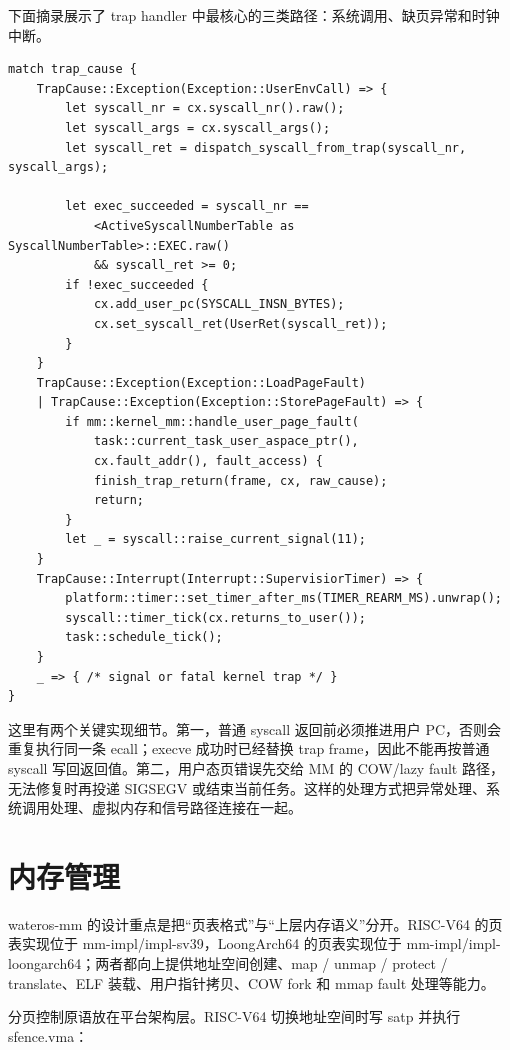 \documentclass[12pt,openany,oneside,AutoFakeBold=true]{ctexbook}
\newcommand{\code}[1]{\textnormal{\rmfamily #1}}
\newcommand{\syscall}[1]{\textnormal{\rmfamily #1}}
\begin{document}
下面摘录展示了 trap handler 中最核心的三类路径：系统调用、缺页异常和时钟中断。

\begin{lstlisting}
match trap_cause {
    TrapCause::Exception(Exception::UserEnvCall) => {
        let syscall_nr = cx.syscall_nr().raw();
        let syscall_args = cx.syscall_args();
        let syscall_ret = dispatch_syscall_from_trap(syscall_nr, syscall_args);

        let exec_succeeded = syscall_nr ==
            <ActiveSyscallNumberTable as SyscallNumberTable>::EXEC.raw()
            && syscall_ret >= 0;
        if !exec_succeeded {
            cx.add_user_pc(SYSCALL_INSN_BYTES);
            cx.set_syscall_ret(UserRet(syscall_ret));
        }
    }
    TrapCause::Exception(Exception::LoadPageFault)
    | TrapCause::Exception(Exception::StorePageFault) => {
        if mm::kernel_mm::handle_user_page_fault(
            task::current_task_user_aspace_ptr(),
            cx.fault_addr(), fault_access) {
            finish_trap_return(frame, cx, raw_cause);
            return;
        }
        let _ = syscall::raise_current_signal(11);
    }
    TrapCause::Interrupt(Interrupt::SupervisiorTimer) => {
        platform::timer::set_timer_after_ms(TIMER_REARM_MS).unwrap();
        syscall::timer_tick(cx.returns_to_user());
        task::schedule_tick();
    }
    _ => { /* signal or fatal kernel trap */ }
}
\end{lstlisting}

这里有两个关键实现细节。第一，普通 syscall 返回前必须推进用户 PC，否则会重复执行同一条 \code{ecall}；\syscall{execve} 成功时已经替换 trap frame，因此不能再按普通 syscall 写回返回值。第二，用户态页错误先交给 MM 的 COW/lazy fault 路径，无法修复时再投递 \code{SIGSEGV} 或结束当前任务。这样的处理方式把异常处理、系统调用处理、虚拟内存和信号路径连接在一起。


\section{内存管理}

\code{wateros-mm} 的设计重点是把“页表格式”与“上层内存语义”分开。RISC-V64 的页表实现位于 \code{mm-impl/impl-sv39}，LoongArch64 的页表实现位于 \code{mm-impl/impl-loongarch64}；两者都向上提供地址空间创建、map / unmap / protect / translate、ELF 装载、用户指针拷贝、COW fork 和 mmap fault 处理等能力。

分页控制原语放在平台架构层。RISC-V64 切换地址空间时写 \code{satp} 并执行 \code{sfence.vma}：
\end{document}

